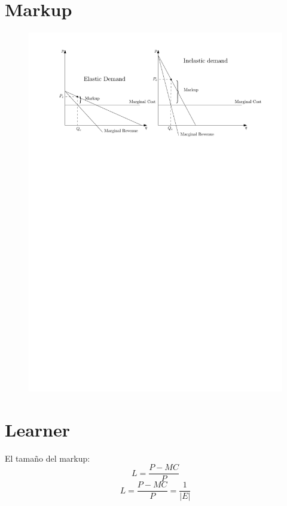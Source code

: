 \section{Markup}

\begin{figure}[H]
    \centering
    \includegraphics[]{Clases/figs/markup} 
\end{figure}


\section{Learner}
El tamaño del markup:
\[
  L = \frac{P-MC}{P} 
\]
\[
  L = \frac{P-MC}{P} = \frac{1}{\left| E \right| } 
\]



